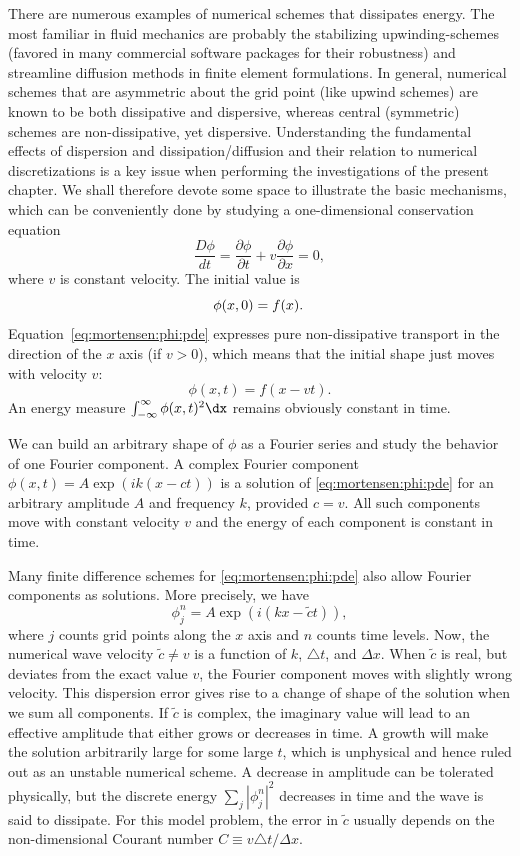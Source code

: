 There are numerous examples of numerical schemes that dissipates
energy. The most familiar in fluid mechanics are probably the stabilizing
upwinding-schemes (favored in many commercial software packages for
their robustness) and streamline diffusion methods in finite element
formulations. In general, numerical schemes that are asymmetric about
the grid point (like upwind schemes) are known to be both dissipative
and dispersive, whereas central (symmetric) schemes are non-dissipative,
yet dispersive. Understanding the fundamental effects of dispersion and
dissipation/diffusion and their relation to numerical discretizations is
a key issue when performing the investigations of the present chapter. We
shall therefore devote some space to illustrate the basic mechanisms,
which can be conveniently done by studying a one-dimensional conservation
equation
\begin{equation}
\frac{D\phi}{dt} = \frac{\partial\phi}{\partial t} + v\frac{\partial\phi}{\partial x}
=0,
\label{eq:mortensen:phi:pde}
\end{equation}
where $v$ is constant velocity. The initial value is
\[ \phi(x,0)=f(x) . \thinspace\]
Equation~\eqref{eq:mortensen:phi:pde} expresses pure non-dissipative transport
in the direction of the $x$ axis (if $v>0$), which means that the initial
shape just moves with velocity $v$:
\[ \phi(x,t) = f(x-vt).\]
An energy measure $\int_{-\infty}^\infty\phi(x,t)^2\dx$ remains
obviously constant in time.

We can build an arbitrary shape of $\phi$ as a Fourier series and
study the behavior of one Fourier component.  A complex Fourier
component $\phi (x,t)=A\exp{(ik(x - ct))}$ is a solution of
\eqref{eq:mortensen:phi:pde} for an arbitrary amplitude $A$ and
frequency $k$, provided $c = v$.  All such components move with
constant velocity $v$ and the energy of each component is constant in
time.

Many finite difference schemes for \eqref{eq:mortensen:phi:pde} also allow
Fourier components as solutions. More precisely, we have
\[ \phi_j^n = A\exp{(i(kx - \tilde c t))},\]
where $j$ counts grid points along the $x$ axis and $n$ counts time
levels.  Now, the numerical wave velocity $\tilde c \neq v$ is a
function of $k$, $\triangle t$, and $\Delta x$.  When $\tilde c$ is
real, but deviates from the exact value $v$, the Fourier component
moves with slightly wrong velocity. This dispersion error gives rise
to a change of shape of the solution when we sum all components.  If
$\tilde c$ is complex, the imaginary value will lead to an effective
amplitude that either grows or decreases in time. A growth will make
the solution arbitrarily large for some large $t$, which is unphysical
and hence ruled out as an unstable numerical scheme.  A decrease in
amplitude can be tolerated physically, but the discrete energy $\sum_j
|\phi_j^n|^2$ decreases in time and the wave is said to dissipate.
For this model problem, the error in $\tilde c$ usually depends on the
non-dimensional Courant number $C\equiv v\triangle t/\Delta x$.

